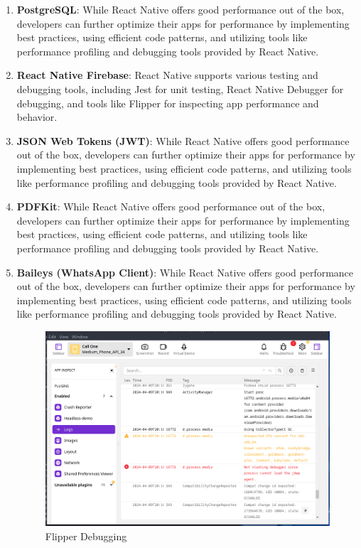 \begin{enumerate}
  \item \textbf{PostgreSQL}: While React Native offers good performance out of the box, developers can further optimize their apps for performance by implementing best practices, using efficient code patterns, and utilizing tools like performance profiling and debugging tools provided by React Native.
 
  \item \textbf{React Native Firebase}: React Native supports various testing and debugging tools, including Jest for unit testing, React Native Debugger for debugging, and tools like Flipper for inspecting app performance and behavior. 
  
  \item \textbf{JSON Web Tokens (JWT)}: While React Native offers good performance out of the box, developers can further optimize their apps for performance by implementing best practices, using efficient code patterns, and utilizing tools like performance profiling and debugging tools provided by React Native.
  
  \item \textbf{PDFKit}: While React Native offers good performance out of the box, developers can further optimize their apps for performance by implementing best practices, using efficient code patterns, and utilizing tools like performance profiling and debugging tools provided by React Native.
  
  \item \textbf{Baileys (WhatsApp Client)}: While React Native offers good performance out of the box, developers can further optimize their apps for performance by implementing best practices, using efficient code patterns, and utilizing tools like performance profiling and debugging tools provided by React Native.
  

  \begin{figure}
    \centering
    \includegraphics[width=1\linewidth]{Media//Chapter 6/flipper.png}
    \caption{Flipper Debugging}
    \label{fig:Flipper Debugging Tool}
  \end{figure}
\end{enumerate}


